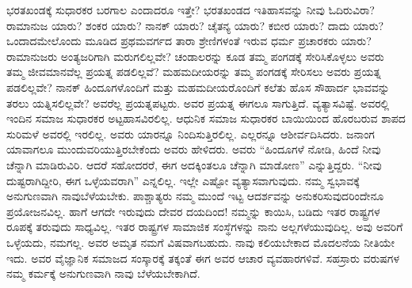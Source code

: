 ಭರತಖಂಡಕ್ಕೆ ಸುಧಾರಕರ ಬರಗಾಲ ಎಂದಾದರೂ ಇತ್ತೇ? ಭರತಖಂಡದ ಇತಿಹಾಸವನ್ನು ನೀವು ಓದಿರುವಿರಾ? ರಾಮಾನುಜ ಯಾರು? ಶಂಕರ ಯಾರು? ನಾನಕ್​ ಯಾರು? ಚೈತನ್ಯ ಯಾರು? ಕಬೀರ ಯಾರು? ದಾದು ಯಾರು? ಒಂದಾದಮೇಲೊಂದು ಮೂಡಿದ ಪ್ರಥಮವರ್ಗದ ತಾರಾ ಶ್ರೇಣಿಗಳಂತೆ ಇರುವ ಧರ್ಮ ಪ್ರಚಾರಕರು ಯಾರು? ರಾಮಾನು\-ಜರು ಅಂತ್ಯಜರಿಗಾಗಿ ಮರುಗಲಿಲ್ಲವೇ? ಚಂಡಾಲರನ್ನು ಕೂಡ ತಮ್ಮ ಪಂಗಡಕ್ಕೆ ಸೇರಿಸಿಕೊಳ್ಳಲು ಅವರು ತಮ್ಮ ಜೀವಮಾನವೆಲ್ಲ ಪ್ರಯತ್ನ ಪಡಲಿಲ್ಲವೆ? ಮಹಮದೀಯರನ್ನು ತಮ್ಮ ಪಂಗಡಕ್ಕೆ ಸೇರಿಸಲು ಅವರು ಪ್ರಯತ್ನ ಪಡಲಿಲ್ಲವೇ? ನಾನಕ್​ ಹಿಂದೂಗಳೊಂದಿಗೆ ಮತ್ತು ಮಹಮದೀಯರೊಂದಿಗೆ ಕಲೆತು ಹೊಸ ಸೌಹಾರ್ದ ಭಾವವನ್ನು ತರಲು ಯತ್ನಿಸಲಿಲ್ಲವೇ? ಅವರೆಲ್ಲ ಪ್ರಯತ್ನಪಟ್ಟರು. ಅವರ ಪ್ರಯತ್ನ ಈಗಲೂ ಸಾಗುತ್ತಿದೆ. ವ್ಯತ್ಯಾಸವಿಷ್ಟೆ. ಅವರಲ್ಲಿ ಇಂದಿನ ಸಮಾಜ ಸುಧಾರಕರ ಅಟ್ಟಹಾಸವಿರಲಿಲ್ಲ. ಆಧುನಿಕ ಸಮಾಜ ಸುಧಾರಕರ ಬಾಯಿಯಿಂದ ಹೊರಬರುವ ಶಾಪದ ಸುರಿಮಳೆ ಅವರಲ್ಲಿ ಇರಲಿಲ್ಲ. ಅವರು ಯಾರನ್ನೂ ನಿಂದಿಸುತ್ತಿರಲಿಲ್ಲ. ಎಲ್ಲರನ್ನೂ ಆಶೀರ್ವದಿಸಿದರು. ಜನಾಂಗ ಯಾವಾಗಲೂ ಮುಂದುವರಿಯುತ್ತಿರಬೇಕೆಂದು ಅವರು ಹೇಳಿದರು. ಅವರು “ಹಿಂದೂಗಳೆ ನೋಡಿ, ಹಿಂದೆ ನೀವು ಚೆನ್ನಾಗಿ ಮಾಡಿರುವಿರಿ. ಆದರೆ ಸಹೋದರರೆ, ಈಗ ಅದಕ್ಕಿಂತಲೂ ಚೆನ್ನಾಗಿ ಮಾಡೋಣ” ಎನ್ನುತ್ತಿದ್ದರು. “ನೀವು ದುಷ್ಟರಾಗಿದ್ದೀರಿ, ಈಗ ಒಳ್ಳೆಯವರಾಗಿ” ಎನ್ನಲಿಲ್ಲ. ಇಲ್ಲೇ ಎಷ್ಟೋ ವ್ಯತ್ಯಾಸವಾಗುವುದು. ನಮ್ಮ ಸ್ವಭಾವಕ್ಕೆ ಅನುಗುಣವಾಗಿ ನಾವು\break ಬೆಳೆಯಬೇಕು. ಪಾಶ್ಚಾತ್ಯರು ನಮ್ಮ ಮುಂದೆ ಇಟ್ಟ ಆದರ್ಶವನ್ನು ಅನುಕರಿಸುವು\break ದರಿಂದೇನೂ ಪ್ರಯೋಜನವಿಲ್ಲ. ಹಾಗೆ ಆಗದೇ ಇರುವುದು ದೇವರ ದಯದಿಂದ! ನಮ್ಮನ್ನು ಕಾಯಿಸಿ, ಬಡಿದು ಇತರ ರಾಷ್ಟ್ರಗಳ ರೂಪಕ್ಕೆ ತರುವುದು ಸಾಧ್ಯವಿಲ್ಲ. ಇತರ ರಾಷ್ಟ್ರಗಳ ಸಾಮಾಜಿಕ ಸಂಸ್ಥೆಗಳನ್ನು ನಾನು ಅಲ್ಲಗಳೆಯುವುದಿಲ್ಲ. ಅವು ಅವರಿಗೆ ಒಳ್ಳೆ\-ಯದು, ನಮಗಲ್ಲ. ಅವರ ಅಮೃತ ನಮಗೆ ವಿಷವಾಗಬಹುದು. ನಾವು ಕಲಿಯಬೇಕಾದ ಮೊದಲನೆಯ ನೀತಿಯೇ ಇದು. ಅವರ ವೈಜ್ಞಾನಿಕ ಸಮಾಜದ ಸಂಸ್ಕಾರಕ್ಕೆ ತಕ್ಕಂತೆ ಈಗ ಅವರ ಆಚಾರ ವ್ಯವಹಾರಗಳಿವೆ. ಸಹಸ್ರಾರು ವರುಷಗಳ ನಮ್ಮ ಕರ್ಮಕ್ಕೆ ಅನುಗುಣವಾಗಿ ನಾವು ಬೆಳೆಯಬೇಕಾಗಿದೆ.

\vskip   4pt


